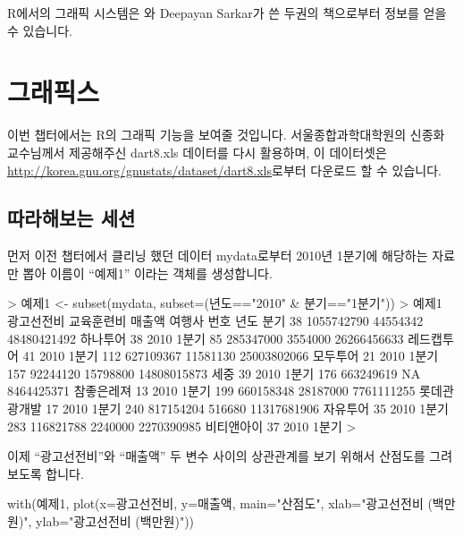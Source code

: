 R에서의 그래픽 시스템은 \citet{Murrell2005}와 Deepayan Sarkar가 쓴 두권의 책으로부터 정보를 얻을 수 있습니다.


\chapter{그래픽스}

이번 챕터에서는 R의 그래픽 기능을 보여줄 것입니다.
서울종합과학대학원의 신종화 교수님께서 제공해주신 dart8.xls 데이터를 다시 활용하며, 이 데이터셋은 \href{http://korea.gnu.org/gnustats/dataset/dart8.xls}{http://korea.gnu.org/gnustats/dataset/dart8.xls}로부터 다운로드 할 수 있습니다.

\section{따라해보는 세션}
먼저 이전 챕터에서 클리닝 했던 데이터 mydata로부터 2010년 1분기에 해당하는 자료만 뽑아 이름이 ``예제1'' 이라는 객체를 생성합니다.

\begin{Schunk}
\begin{Soutput}	
> 예제1 <- subset(mydata, subset=(년도=="2010" & 분기=="1분기"))
> 예제1 
    광고선전비 교육훈련비      매출액       여행사 번호 년도  분기
38  1055742790   44554342 48480421492     하나투어   38 2010 1분기
85   285347000    3554000 26266456633   레드캡투어   41 2010 1분기
112  627109367   11581130 25003802066     모두투어   21 2010 1분기
157   92244120   15798800 14808015873         세중   39 2010 1분기
176  663249619         NA  8464425371   참좋은레져   13 2010 1분기
199  660158348   28187000  7761111255 롯데관광개발   17 2010 1분기
240  817154204     516680 11317681906     자유투어   35 2010 1분기
283  116821788    2240000  2270390985   비티앤아이   37 2010 1분기
>
\end{Soutput}
\end{Schunk}

이제 ``광고선전비''와 ``매출액'' 두 변수 사이의 상관관계를 보기 위해서 산점도를 그려보도록 합니다.

\begin{Schunk}
\begin{Soutput}	
with(예제1, plot(x=광고선전비, y=매출액, main="산점도", xlab="광고선전비 (백만원)", ylab="광고선전비 (백만원)"))
\end{Soutput}
\end{Schunk}


